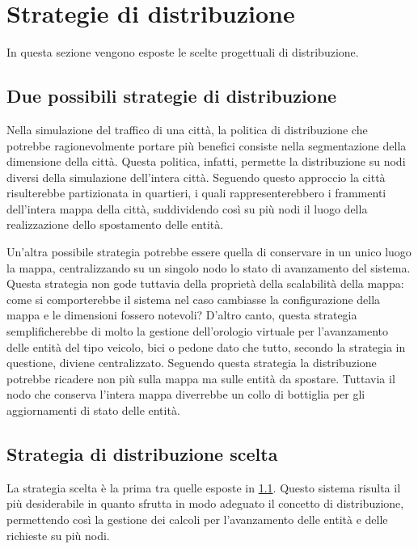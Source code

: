 \section{Strategie di distribuzione}
In questa sezione vengono esposte le scelte progettuali di distribuzione.

\subsection{Due possibili strategie di distribuzione}
\label{scelted}
Nella simulazione del traffico di una città, la politica di distribuzione che 
potrebbe ragionevolmente portare più benefici consiste nella segmentazione 
della dimensione della città. Questa politica, infatti, permette la distribuzione
su nodi diversi della simulazione dell'intera città. 
Seguendo questo approccio la città risulterebbe partizionata in quartieri, i
quali rappresenterebbero i frammenti dell'intera mappa della città, suddividendo
così su più nodi il luogo della realizzazione dello spostamento delle entità. 

Un'altra possibile strategia potrebbe essere quella di conservare in un unico
luogo la mappa, centralizzando su un singolo nodo lo stato di avanzamento del
sistema. Questa strategia non gode tuttavia della proprietà della scalabilità
della mappa: come si comporterebbe il sistema nel caso cambiasse la
configurazione della mappa e le dimensioni fossero notevoli? 
D'altro canto, questa strategia semplificherebbe di molto
la gestione dell'orologio virtuale per l'avanzamento delle entità del tipo veicolo,
bici o pedone dato che tutto, secondo la strategia in questione, diviene
centralizzato. Seguendo questa strategia la distribuzione potrebbe ricadere non
più sulla mappa ma sulle entità da spostare. Tuttavia il nodo che conserva
l'intera mappa diverrebbe un collo di bottiglia per gli aggiornamenti di stato
delle entità. 

\subsection{Strategia di distribuzione scelta}
La strategia scelta è la prima tra quelle esposte in \ref{scelted}. Questo
sistema risulta il più desiderabile in quanto sfrutta in modo adeguato il
concetto di distribuzione, permettendo così la gestione dei calcoli per
l'avanzamento delle entità e delle richieste su più nodi.

